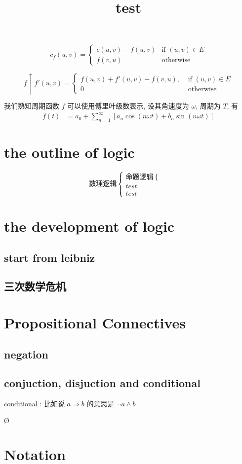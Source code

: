 \documentclass[a4paper, 10pt]{ctexart} %
\title{test}
\begin{document}
\tableofcontents
\maketitle
$$ c_f \left(u ,v \right) = \begin{cases} c (u,v)  -f (u,v) & \text{if } \left(u ,v\right) \in E \\ f \left( v, u\right) & \text{otherwise} \end{cases} $$

$$ f\uparrow f' \left( u ,v\right)= \begin{cases} f( u , v) + f' \left(u ,v\right) - f\left( v , u\right), &\text{ if } \left(u ,v\right) \in E \\ 0 & \text{ otherwise} \end{cases} $$

我们熟知周期函数 $f$ 可以使用傅里叶级数表示, 设其角速度为 $\omega$, 周期为 $T$, 有
$$ \begin{aligned} f \left(t\right) & = a_0 + \sum_{n=1} ^{\infty} \left[ a_{n} \cos  \left(n\omega t\right) + b_{n} \sin  \left(n \omega t\right)\right] \end{aligned} $$
\section{the outline of logic}
\[
    \text{数理逻辑}
    \begin{cases}
        \text{命题逻辑}
        \begin{cases}
            \text{}\\
            \text{}
        \end{cases}\\
        test\\
        test
    \end{cases}
\]
\section{the development of logic}
\subsection{start from leibniz}
\subsection{三次数学危机}
\section{Propositional Connectives}
\subsection{negation}
\subsection{conjuction, disjuction and conditional}

conditional : 比如说 $a\Rightarrow b$ 的意思是 $\neg a \land b$

\O
\section{Notation}
\end{document}
